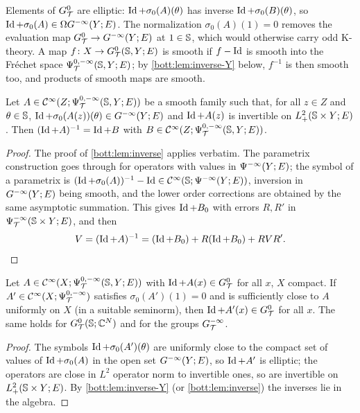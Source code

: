 Elements of $G^{0}_{\mathcal{T}}$ are elliptic: $\operatorname{Id}+\sigma_0(A)(\theta)$ has inverse $\operatorname{Id}+\sigma_0(B)(\theta)$, so
$\operatorname{Id}+\sigma_0(A)\in\Omega G^{-\infty}(Y;E)$. The normalization $\sigma_0(A)(1)=0$ removes the
evaluation map $G^{0}_{\mathcal{T}}\to G^{-\infty}(Y;E)$ at $1\in\mathbb{S}$, which would otherwise carry odd
K-theory. A map $f\colon X\to G^{0}_{\mathcal{T}}(\mathbb{S},Y;E)$ is smooth if $f-\operatorname{Id}$ is smooth into the
Fr\'echet space $\Psi^{0,-\infty}_{\mathcal{T}}(\mathbb{S},Y;E)$; by \cref{bott:lem:inverse-Y} below, $f^{-1}$ is then
smooth too, and products of smooth maps are smooth.

\begin{lemma}\label{bott:lem:inverse-Y}
  Let $A\in\mathcal{C}^\infty(Z;\Psi^{0,-\infty}_{\mathcal{T}}(\mathbb{S},Y;E))$ be a smooth family such that, for
  all $z\in Z$ and $\theta\in\mathbb{S}$, $\operatorname{Id}+\sigma_0(A(z))(\theta)\in G^{-\infty}(Y;E)$ and
  $\operatorname{Id}+A(z)$ is invertible on $L^2_+(\mathbb{S}\times Y;E)$. Then $(\operatorname{Id}+A)^{-1}=\operatorname{Id}+B$ with
  $B\in\mathcal{C}^\infty(Z;\Psi^{0,-\infty}_{\mathcal{T}}(\mathbb{S},Y;E))$.
\end{lemma}
\begin{proof}
  The proof of \cref{bott:lem:inverse} applies verbatim. The parametrix construction
  goes through for operators with values in $\Psi^{-\infty}(Y;E)$; the symbol of a parametrix
  is $(\operatorname{Id}+\sigma_0(A))^{-1}-\operatorname{Id}\in\mathcal{C}^\infty(\mathbb{S};\Psi^{-\infty}(Y;E))$, inversion in
  $G^{-\infty}(Y;E)$ being smooth, and the lower order corrections are obtained by the same
  asymptotic summation. This gives $\operatorname{Id}+B_0$ with errors $R,R'$ in
  $\Psi^{-\infty}_{\mathcal{T}}(\mathbb{S}\times Y;E)$, and then
  \begin{equation*}
    V=(\operatorname{Id}+A)^{-1}=(\operatorname{Id}+B_0)+R(\operatorname{Id}+B_0)+RVR'.
  \end{equation*}
\end{proof}

\begin{lemma}\label{bott:lem:open}
  Let $A\in\mathcal{C}^\infty(X;\Psi^{0,-\infty}_{\mathcal{T}}(\mathbb{S},Y;E))$ with $\operatorname{Id}+A(x)\in G^{0}_{\mathcal{T}}$ for all $x$, $X$
  compact. If $A'\in\mathcal{C}^\infty(X;\Psi^{0,-\infty}_{\mathcal{T}})$ satisfies $\sigma_0(A')(1)=0$ and is
  sufficiently close to $A$ uniformly on $X$ (in a suitable seminorm), then
  $\operatorname{Id}+A'(x)\in G^{0}_{\mathcal{T}}$ for all $x$. The same holds for $G^{0}_{\mathcal{T}}(\mathbb{S};\mathbb{C}^N)$ and for the groups
  $G^{-\infty}_{\mathcal{T}}$.
\end{lemma}
\begin{proof}
  The symbols $\operatorname{Id}+\sigma_0(A')(\theta)$ are uniformly close to the compact set of values of
  $\operatorname{Id}+\sigma_0(A)$ in the open set $G^{-\infty}(Y;E)$, so $\operatorname{Id}+A'$ is elliptic; the operators
  are close in $L^2$ operator norm to invertible ones, so are invertible on
  $L^2_+(\mathbb{S}\times Y;E)$. By \cref{bott:lem:inverse-Y} (or \cref{bott:lem:inverse}) the inverses lie in the algebra.
\end{proof}

